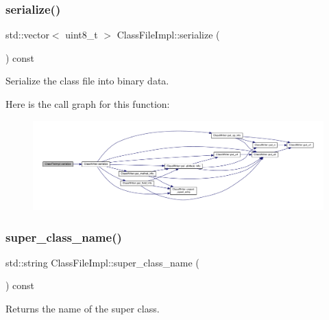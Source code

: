 \mbox{\label{classClassFileImpl_a4e2a4657d4b102369ba7305251d41d00}} 
\subsubsection{\texorpdfstring{serialize()}{serialize()}}
{\footnotesize\ttfamily std\+::vector$<$ uint8\+\_\+t $>$ Class\+File\+Impl\+::serialize (\begin{DoxyParamCaption}{ }\end{DoxyParamCaption}) const}



Serialize the class file into binary data. 

Here is the call graph for this function\+:
\nopagebreak
\begin{figure}[H]
\begin{center}
\leavevmode
\includegraphics[width=350pt]{classClassFileImpl_a4e2a4657d4b102369ba7305251d41d00_cgraph}
\end{center}
\end{figure}
\mbox{\label{classClassFileImpl_afd7229efcf341804086bcf6c00bb4820}} 
\subsubsection{\texorpdfstring{super\+\_\+class\+\_\+name()}{super\_class\_name()}}
{\footnotesize\ttfamily std\+::string Class\+File\+Impl\+::super\+\_\+class\+\_\+name (\begin{DoxyParamCaption}{ }\end{DoxyParamCaption}) const}



Returns the name of the super class. 

